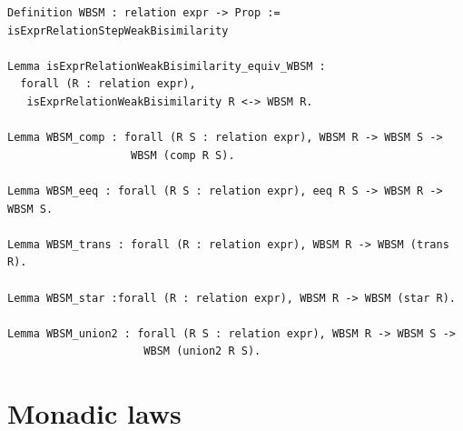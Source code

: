 \documentclass[12pt,twoside,notitlepage]{report}
\theoremstyle{plain}%
\theoremstyle{definition}
\theoremstyle{remark}
\begin{document}
\begin{minipage}{\linewidth}
\begin{lstlisting}[language={Coq}, caption={Weak bisimilarity properties}]
Definition WBSM : relation expr -> Prop := isExprRelationStepWeakBisimilarity

Lemma isExprRelationWeakBisimilarity_equiv_WBSM : 
  forall (R : relation expr), 
   isExprRelationWeakBisimilarity R <-> WBSM R.

Lemma WBSM_comp : forall (R S : relation expr), WBSM R -> WBSM S -> 
                   WBSM (comp R S).

Lemma WBSM_eeq : forall (R S : relation expr), eeq R S -> WBSM R -> WBSM S.

Lemma WBSM_trans : forall (R : relation expr), WBSM R -> WBSM (trans R).

Lemma WBSM_star :forall (R : relation expr), WBSM R -> WBSM (star R).

Lemma WBSM_union2 : forall (R S : relation expr), WBSM R -> WBSM S -> 
                     WBSM (union2 R S).
\end{lstlisting}
\end{minipage}
\section{Monadic laws}
\end{document}
